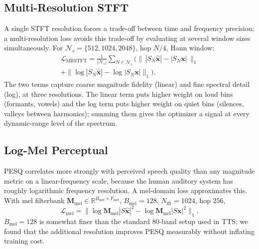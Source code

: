 \documentclass[journal,10pt]{IEEEtran}
\newcommand{\R}{\mathbb{R}}
\newcommand{\bx}{\mathbf{x}}
\newcommand{\bM}{\mathbf{M}}
\newcommand{\Lcal}{\mathcal{L}}
\newcommand{\Ncal}{\mathcal{N}}
\begin{document}
\subsection{Multi-Resolution STFT}
A single STFT resolution forces a trade-off between time and frequency precision; a multi-resolution loss avoids this trade-off by evaluating at several window sizes simultaneously. For \(\Ncal_s=\{512,1024,2048\}\), hop \(N/4\), Hann window:
\begin{multline}
\Lcal_{\mathrm{MRSTFT}}=\frac{1}{|\Ncal_s|}\sum_{N\in\Ncal_s}\!\!\Bigg(\!\|\,|S_N\hat{\bx}|-|S_N\bx|\,\|_1\\
+\|\log|S_N\hat{\bx}|-\log|S_N\bx|\|_1\!\Bigg).
\label{eq:mrstft}
\end{multline}
The two terms capture coarse magnitude fidelity (linear) and fine spectral detail (log), at three resolutions. The linear term puts higher weight on loud bins (formants, vowels) and the log term puts higher weight on quiet bins (silences, valleys between harmonics); summing them gives the optimizer a signal at every dynamic-range level of the spectrum.

\subsection{Log-Mel Perceptual}
PESQ correlates more strongly with perceived speech quality than any magnitude metric on a linear-frequency scale, because the human auditory system has roughly logarithmic frequency resolution. A mel-domain loss approximates this. With mel filterbank \(\bM_{\mathrm{mel}}\in\R^{B_{\mathrm{mel}}\times F_{\mathrm{mel}}}\), \(B_{\mathrm{mel}}=128\), \(N_{\mathrm{fft}}=1024\), hop \(256\),
\begin{equation}
\Lcal_{\mathrm{mel}}=\|\log\bM_{\mathrm{mel}}|S\hat{\bx}|^2-\log\bM_{\mathrm{mel}}|S\bx|^2\|_1.
\label{eq:mel}
\end{equation}
\(B_{\mathrm{mel}}=128\) is somewhat finer than the standard \(80\)-band setup used in TTS; we found that the additional resolution improves PESQ measurably without inflating training cost.
\end{document}
